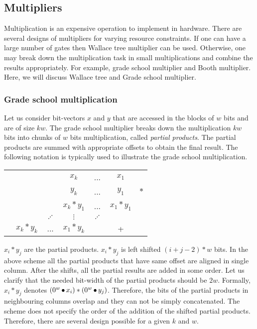 \subsection{Multipliers}

Multiplication is an expensive operation to implement in hardware.
%
There are several designs of multipliers for varying
resource constraints.
%
If one can have a large number of gates then Wallace tree
multiplier can be used.
%
Otherwise, one may break down the multiplication task in
small multiplications and combine the results appropriately.
%
For example, grade school multiplier and Booth multiplier.
%
Here, we will discuss Wallace tree and Grade school multiplier.

\subsubsection{Grade school multiplication}

Let us consider bit-vectors $x$ and $y$ that are accessed in the blocks of $w$
bits and are of size $kw$.
%
The grade school multiplier breaks down the multiplication $kw$ bits
into chunks of $w$ bits multiplication, called {\em partial products}.
%
The partial products are summed with appropriate offsets to obtain
the final result.
%
The following notation is typically used to illustrate
the grade school multiplication.
%
\begin{center}
\begin{tabular}{c@{\quad}c@{\quad}c@{\quad}c@{\quad}c@{\quad}c@{\quad}c}
  &&& $x_{k}$ & ... & $x_1$&\\ 
  &&& $y_{k}$ & ... & $y_1$&$*$\\ \hline
  &&&$x_k*y_1$& ... & $x_1*y_1$&\\
  &&$\iddots$&$\vdots$& $\iddots$ && \\
  &$x_k*y_k$& ... &$x_1*y_k$&  & +&\\\hline
\end{tabular}  
\end{center}
$x_i * y_j$ are the partial products.
%
$x_i*y_j$ is left shifted $(i+j-2)*w$ bits. 
%
In the above scheme all the partial products that have same offset are 
aligned in single column.
%
After the shifts, all the partial results are added in some order.
%
Let us clarify that the needed bit-width of the partial products should be $2w$.
%
Formally, $x_i * y_j$ denotes $(0^w \mathop{\bullet} x_i)*(0^w \mathop{\bullet} y_j)$.
%
Therefore, the bits of the partial products in neighbouring columns overlap
and they can not be simply concatenated.
%
The scheme does not specify the order of the addition
of the shifted partial products.
%
Therefore, there are several design possible for a given $k$ and $w$.

